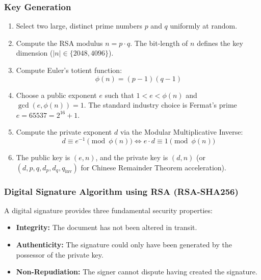 \documentclass[12pt,a4paper]{article}
\begin{document}
\subsubsection{Key Generation}
\begin{enumerate}
    \item Select two large, distinct prime numbers $p$ and $q$ uniformly at random.
    \item Compute the RSA modulus $n = p \cdot q$. The bit-length of $n$ defines the key dimension ($|n| \in \{2048, 4096\}$).
    \item Compute Euler's totient function:
    \begin{equation}
        \phi(n) = (p - 1)(q - 1)
    \end{equation}
    \item Choose a public exponent $e$ such that $1 < e < \phi(n)$ and $\gcd(e, \phi(n)) = 1$. The standard industry choice is Fermat's prime $e = 65537 = 2^{16} + 1$.
    \item Compute the private exponent $d$ via the Modular Multiplicative Inverse:
    \begin{equation}
        d \equiv e^{-1} \pmod{\phi(n)} \iff e \cdot d \equiv 1 \pmod{\phi(n)}
    \end{equation}
    \item The public key is $(e, n)$, and the private key is $(d, n)$ (or $(d, p, q, d_p, d_q, q_{\text{inv}})$ for Chinese Remainder Theorem acceleration).
\end{enumerate}

\subsubsection{Digital Signature Algorithm using RSA (RSA-SHA256)}
A digital signature provides three fundamental security properties:
\begin{itemize}
    \item \textbf{Integrity:} The document has not been altered in transit.
    \item \textbf{Authenticity:} The signature could only have been generated by the possessor of the private key.
    \item \textbf{Non-Repudiation:} The signer cannot dispute having created the signature.
\end{itemize}
\end{document}
